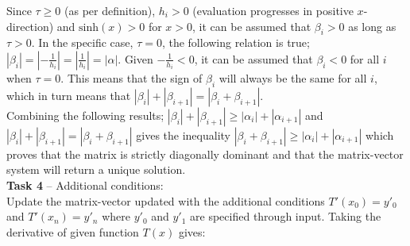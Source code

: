 \documentclass{article}
\newcommand{\T}[2]{\textbf{Task #1} -- #2:\\}
\begin{document}
  Since $\tau \geq 0$ (as per definition), $h_i > 0$ (evaluation progresses in positive
  $x$-direction) and $\mathrm{sinh}(x) > 0$ for $x > 0$, it can be assumed that
  $\beta_i > 0$ as long as $\tau > 0$.
  In the specific case, $\tau = 0$, the following relation is true; $|\beta_i| = |-\frac{1}{h_i}| =
  |\frac{1}{h_i}| = |\alpha|$.
  Given $-\frac{1}{h_i} < 0$, it can be assumed that $\beta_i < 0$ for all $i$
  when $\tau = 0$. This means that the sign of $\beta_i$ will always be the
  same for all $i$, which in turn means that $|\beta_i| + |\beta_{i+1}| =
  |\beta_i + \beta_{i+1}|$. \\


  Combining the following results; $ |\beta_i| + |\beta_{i+1}| \geq |\alpha_i|
  + |\alpha_{i+1}| $ and $|\beta_i| + |\beta_{i+1}| =
  |\beta_i + \beta_{i+1}|$ gives the inequality $|\beta_i + \beta_{i+1}| \geq |\alpha_i| +
  |\alpha_{i+1}|$ which proves that the matrix is strictly diagonally dominant
  and that the matrix-vector system will return a unique solution. \\

\T{4}{Additional conditions}


  Update the matrix-vector updated with the additional conditions $T'(x_0) =
  y'_0$ and $T'(x_n) = y'_n$ where $y'_0$ and $y'_1$ are specified through
  input. Taking the derivative of given function $T(x)$ gives:
\end{document}
